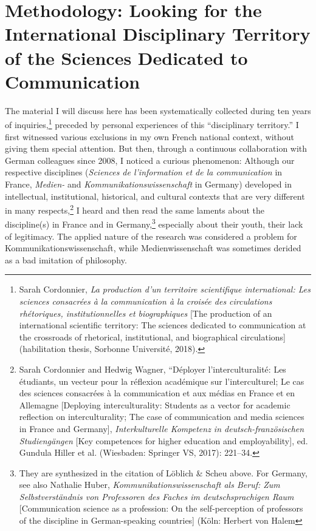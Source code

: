 \documentclass{tufte-handout}
\begin{document}
\hypertarget{methodology-looking-for-the-international-disciplinary-territory-of-the-sciences-dedicated-to-communication}{%
\section{Methodology: Looking for the International Disciplinary
Territory of the Sciences Dedicated to
Communication}\label{methodology-looking-for-the-international-disciplinary-territory-of-the-sciences-dedicated-to-communication}}

The material I will discuss here has been systematically collected
during ten years of inquiries,\footnote{Sarah Cordonnier, \emph{La
  production d'un territoire scientifique international: Les sciences
  consacrées à la communication à la croisée des circulations
  rhétoriques, institutionnelles et biographiques} {[}The production of
  an international scientific territory: The sciences dedicated to
  communication at the crossroads of rhetorical, institutional, and
  biographical circulations{]} (habilitation thesis, Sorbonne
  Université, 2018).} preceded by personal experiences of this
``disciplinary territory.'' I first witnessed various exclusions in my
own French national context, without giving them special attention. But
then, through a continuous collaboration with German colleagues since
2008, I noticed a curious phenomenon: Although our respective
disciplines (\emph{Sciences de l'information et de la communication} in
France, \emph{Medien-} and \emph{Kommunikationswissenschaft} in Germany)
developed in intellectual, institutional, historical, and cultural
contexts that are very different in many respects,\footnote{Sarah
  Cordonnier and Hedwig Wagner, ``Déployer l'interculturalité: Les
  étudiants, un vecteur pour la réflexion académique sur
  l'interculturel; Le cas des sciences consacrées à la communication et
  aux médias en France et en Allemagne {[}Deploying interculturality:
  Students as a vector for academic reflection on interculturality; The
  case of communication and media sciences in France and Germany{]},
  \emph{Interkulturelle Kompetenz in deutsch-französischen
  Studiengängen} {[}Key competences for higher education and
  employability{]}, ed. Gundula Hiller et al. (Wiesbaden: Springer VS,
  2017): 221--34.} I heard and then read the same laments about the
discipline(s) in France and in Germany,\footnote{They are synthesized in
  the citation of Löblich \& Scheu above. For Germany, see also Nathalie
  Huber, \emph{Kommunikationswissenschaft als Beruf: Zum
  Selbstverständnis von Professoren des Faches im deutschsprachigen
  Raum} {[}Communication science as a profession: On the self-perception
  of professors of the discipline in German-speaking countries{]} (Köln:
  Herbert von Halem} especially about their youth, their lack of
legitimacy. The applied nature of the research was considered a problem
for Kommunikationswissenschaft, while Medienwissenschaft was sometimes
derided as a bad imitation of philosophy.
\end{document}
